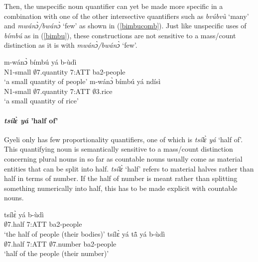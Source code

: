 Then, the unspecific noun quantifier can yet be made more specific in a combination with one of the other intersective quantifiers such as {\itshape bvúbvù} `many' and {\itshape mwánɔ̀/bwánɔ̀} `few' as shown in (\ref{bimbucomb}). Just like unspecific uses of {\itshape bímbú} as in (\ref{bimbu}), these constructions are not sensitive to a mass/count distinction as it is with {\itshape mwánɔ̀/bwánɔ̀} `few'.

\begin{exe}
\ex\label{bimbucomb}
\begin{xlist}
\ex\label{bimbucomb1}
 \gll  m-wánɔ̀  bímbú yá b-ùdì  \\
          N1-small   $\emptyset$7.quantity 7:ATT ba2-people  \\
    \trans `a small quantity of people'
\ex \label{bimbucomb2}
  \gll    m-wánɔ̀ bímbú yá ndísì \\
              N1-small  $\emptyset$7.quantity 7:ATT $\emptyset$3.rice \\
    \trans `a small quantity of rice'
\end {xlist}
\end {exe}

\paragraph{{\itshape tsílɛ̀ yá} 'half of'}
Gyeli only has few proportionality quantifiers, one of which is {\itshape tsílɛ̀ yá} `half of'. This quantifying noun is semantically sensitive to a mass/count distinction concerning plural nouns in so far as countable nouns usually come as material entities that can be split into half.
{\itshape tsílɛ̀} `half' refers to material halves rather than half in terms of number. If the half of number is meant rather than splitting something numerically into half, this has to be made explicit with countable nouns.

\begin{exe}
\ex\label{tsile}
\begin{xlist}
\ex\label{tsile1}
 \gll  tsílɛ̀ yá b-ùdì  \\
          $\emptyset$7.half 7:ATT ba2-people  \\
    \trans `the half of people (their bodies)'
\ex \label{tsile2}
  \gll    tsílɛ̀ yá tã̂ yá b-ùdì \\
              $\emptyset$7.half 7:ATT $\emptyset$7.number ba2-people \\
    \trans `half of the people (their number)'
\end {xlist}
\end {exe}

